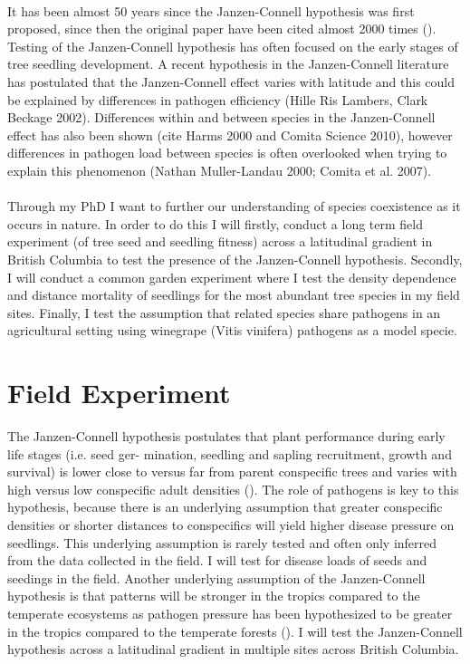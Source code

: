 \documentclass{article}
\begin{document}
\paragraph{}It has been almost 50 years since the Janzen-Connell hypothesis was first proposed, since then the original paper have been cited almost 2000 times (\citep{Comita2014}). Testing of the Janzen-Connell hypothesis has often focused on the early stages of tree seedling development. A recent hypothesis in the Janzen-Connell literature has postulated that the Janzen-Connell effect varies with latitude and this could be explained by differences in pathogen efficiency (Hille Ris Lambers, Clark Beckage 2002). Differences within and between species in the Janzen-Connell effect has also been shown (cite Harms 2000 and Comita Science 2010), however differences in pathogen load between species is often overlooked when trying to explain this phenomenon (Nathan Muller-Landau 2000; Comita et al. 2007). 

\paragraph{}Through my PhD I want to further our understanding of species coexistence as it occurs in nature. In order to do this I will firstly, conduct a long term field experiment (of tree seed and seedling fitness) across a latitudinal gradient in British Columbia to test the presence of the Janzen-Connell hypothesis. Secondly, I will conduct a common garden experiment where I test the density dependence and distance mortality of seedlings for the most abundant tree species in my field sites. Finally, I test the assumption that related species share pathogens in an agricultural setting using winegrape (Vitis vinifera) pathogens as a model specie. 

\section{Field Experiment}
The Janzen-Connell hypothesis postulates that plant performance during early life stages (i.e. seed ger- mination, seedling and sapling recruitment, growth and survival) is lower close to versus far from parent conspecific trees and varies with high versus low conspecific adult densities (\citep{Comita2014}). The role of pathogens is key to this hypothesis, because there is an underlying assumption that greater conspecific densities or shorter distances to conspecifics will yield higher disease pressure on seedlings. This underlying assumption is rarely tested and often only inferred from the data collected in the field. I will test for disease loads of seeds and seedings in the field. Another underlying assumption of the Janzen-Connell hypothesis is that patterns will be stronger in the tropics compared to the temperate ecosystems as pathogen pressure has been hypothesized to be greater in the tropics compared to the temperate forests (\citep{Comita2014}). I will test the Janzen-Connell hypothesis across a latitudinal gradient in multiple sites across British Columbia. 
\end{document}

